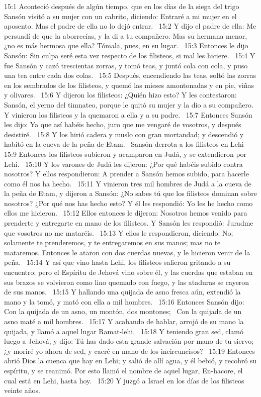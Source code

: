 15:1 Aconteció después de algún tiempo, que en los días de la siega del trigo Sansón visitó a su mujer con un cabrito, diciendo: Entraré a mi mujer en el aposento. Mas el padre de ella no lo dejó entrar.  
15:2 Y dijo el padre de ella: Me persuadí de que la aborrecías, y la di a tu compañero. Mas su hermana menor, ¿no es más hermosa que ella? Tómala, pues, en su lugar.  
15:3 Entonces le dijo Sansón: Sin culpa seré esta vez respecto de los filisteos, si mal les hiciere.  
15:4 Y fue Sansón y cazó trescientas zorras, y tomó teas, y juntó cola con cola, y puso una tea entre cada dos colas.  
15:5 Después, encendiendo las teas, soltó las zorras en los sembrados de los filisteos, y quemó las mieses amontonadas y en pie, viñas y olivares.  
15:6 Y dijeron los filisteos: ¿Quién hizo esto? Y les contestaron: Sansón, el yerno del timnateo, porque le quitó su mujer y la dio a su compañero. Y vinieron los filisteos y la quemaron a ella y a su padre.  
15:7 Entonces Sansón les dijo: Ya que así habéis hecho, juro que me vengaré de vosotros, y después desistiré.  
15:8 Y los hirió cadera y muslo con gran mortandad; y descendió y habitó en la cueva de la peña de Etam.  
Sansón derrota a los filisteos en Lehi  
15:9 Entonces los filisteos subieron y acamparon en Judá, y se extendieron por Lehi.  
15:10 Y los varones de Judá les dijeron: ¿Por qué habéis subido contra nosotros? Y ellos respondieron: A prender a Sansón hemos subido, para hacerle como él nos ha hecho.  
15:11 Y vinieron tres mil hombres de Judá a la cueva de la peña de Etam, y dijeron a Sansón: ¿No sabes tú que los filisteos dominan sobre nosotros? ¿Por qué nos has hecho esto? Y él les respondió: Yo les he hecho como ellos me hicieron.  
15:12 Ellos entonces le dijeron: Nosotros hemos venido para prenderte y entregarte en mano de los filisteos. Y Sansón les respondió: Juradme que vosotros no me mataréis.  
15:13 Y ellos le respondieron, diciendo: No; solamente te prenderemos, y te entregaremos en sus manos; mas no te mataremos. Entonces le ataron con dos cuerdas nuevas, y le hicieron venir de la peña.  
15:14 Y así que vino hasta Lehi, los filisteos salieron gritando a su encuentro; pero el Espíritu de Jehová vino sobre él, y las cuerdas que estaban en sus brazos se volvieron como lino quemado con fuego, y las ataduras se cayeron de sus manos.  
15:15 Y hallando una quijada de asno fresca aún, extendió la mano y la tomó, y mató con ella a mil hombres.  
15:16 Entonces Sansón dijo:  
Con la quijada de un asno, un montón, dos montones;  
Con la quijada de un asno maté a mil hombres.  
15:17 Y acabando de hablar, arrojó de su mano la quijada, y llamó a aquel lugar Ramat-lehi.  
15:18 Y teniendo gran sed, clamó luego a Jehová, y dijo: Tú has dado esta grande salvación por mano de tu siervo; ¿y moriré yo ahora de sed, y caeré en mano de los incircuncisos?  
15:19 Entonces abrió Dios la cuenca que hay en Lehi; y salió de allí agua, y él bebió, y recobró su espíritu, y se reanimó. Por esto llamó el nombre de aquel lugar, En-hacore, el cual está en Lehi, hasta hoy.  
15:20 Y juzgó a Israel en los días de los filisteos veinte años.  
